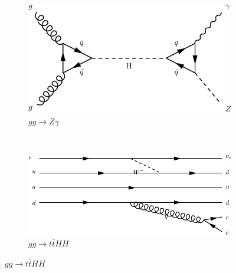 \begin{figure}[h]
\begin{subfigure}[b]{0.3\textwidth}
  \end{subfigure}
  ~
  \begin{subfigure}[b]{0.3\textwidth}
    \includegraphics[width=\textwidth]{../dia/17.pdf}
    \caption{$gg \rightarrow Z\gamma$}
    \label{fey:17}
  \end{subfigure}%
  ~
  \begin{subfigure}[b]{0.3\textwidth}
    \includegraphics[width=\textwidth]{../dia/18.pdf}
    \caption{$gg\rightarrow t\bar{t}HH$}
    \label{fey:18}
  \end{subfigure}%
\end{figure}
